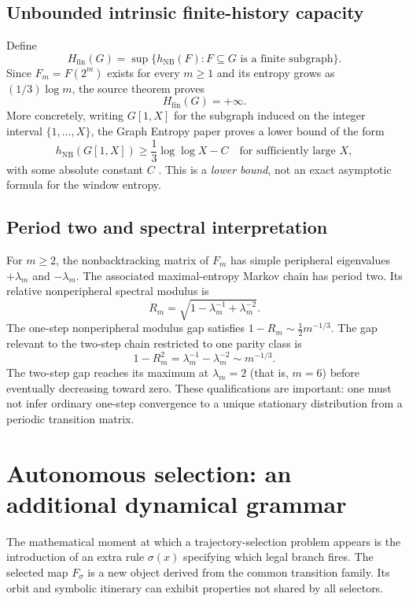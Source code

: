 \documentclass[11pt,a4paper]{article}
\theoremstyle{definition}\newtheorem{definition}[theorem]{Definition}
\newcommand{\NB}{\mathrm{NB}}
\begin{document}
\subsection{Unbounded intrinsic finite-history capacity}
Define
\begin{equation}\label{eq:Hfin}
H_{\mathrm{fin}}(G)=\sup\{h_{\NB}(F):F\subseteq G\text{ is a finite subgraph}\}.
\end{equation}
Since $F_m=F(2^m)$ exists for every $m\ge1$ and its entropy grows as $(1/3)\log m$, the source theorem proves
\begin{equation}\label{eq:unbounded}
H_{\mathrm{fin}}(G)=+\infty.
\end{equation}
More concretely, writing $G[1,X]$ for the subgraph induced on the integer interval $\{1,\ldots,X\}$, the Graph Entropy paper proves a lower bound of the form
\begin{equation}\label{eq:window}
h_{\NB}(G[1,X])\ge\frac13\log\log X-C
\quad\text{for sufficiently large }X,
\end{equation}
with some absolute constant $C$ \cite{entropy}. This is a \emph{lower bound}, not an exact asymptotic formula for the window entropy.

\subsection{Period two and spectral interpretation}
For $m\ge2$, the nonbacktracking matrix of $F_m$ has simple peripheral eigenvalues $+\lambda_m$ and $-\lambda_m$. The associated maximal-entropy Markov chain has period two. Its relative nonperipheral spectral modulus is
\begin{equation}\label{eq:R}
R_m=\sqrt{1-\lambda_m^{-1}+\lambda_m^{-2}}.
\end{equation}
The one-step nonperipheral modulus gap satisfies $1-R_m\sim\tfrac12m^{-1/3}$. The gap relevant to the two-step chain restricted to one parity class is
\begin{equation}\label{eq:two-step}
1-R_m^2=\lambda_m^{-1}-\lambda_m^{-2}\sim m^{-1/3}.
\end{equation}
The two-step gap reaches its maximum at $\lambda_m=2$ (that is, $m=6$) before eventually decreasing toward zero. These qualifications are important: one must not infer ordinary one-step convergence to a unique stationary distribution from a periodic transition matrix.

\section{Autonomous selection: an additional dynamical grammar}
\label{sec:selectors}
The mathematical moment at which a trajectory-selection problem appears is the introduction of an extra rule $\sigma(x)$ specifying which legal branch fires. The selected map $F_\sigma$ is a new object derived from the common transition family. Its orbit and symbolic itinerary can exhibit properties not shared by all selectors.
\end{document}
